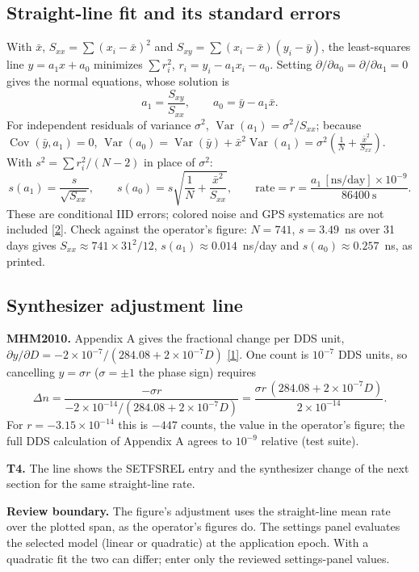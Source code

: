 \documentclass[11pt,a4paper]{article}
\newcommand{\manual}{\href{https://www.gb.nrao.edu/~fghigo/timer/MSMmaser/Maser_UG_75666-201_Rev_J.PDF}{[1]}}
\newcommand{\nist}{\href{https://tf.nist.gov/general/pdf/2220.pdf}{[2]}}
\newcommand{\warning}[1]{\par\noindent\colorbox{light}{\parbox{\dimexpr\linewidth-2\fboxsep}{\textbf{Review boundary.} #1}}\par}
\begin{document}
\subsection{Straight-line fit and its standard errors}
With $\bar x$, $S_{xx}=\sum(x_i-\bar x)^2$ and $S_{xy}=\sum(x_i-\bar x)(y_i-\bar y)$, the
least-squares line $y=a_1x+a_0$ minimizes $\sum r_i^2$, $r_i=y_i-a_1x_i-a_0$. Setting
$\partial/\partial a_0=\partial/\partial a_1=0$ gives the normal equations, whose solution is
\[
a_1=\frac{S_{xy}}{S_{xx}},\qquad a_0=\bar y-a_1\bar x .
\]
For independent residuals of variance $\sigma^2$, $\operatorname{Var}(a_1)=\sigma^2/S_{xx}$;
because $\operatorname{Cov}(\bar y,a_1)=0$,
$\operatorname{Var}(a_0)=\operatorname{Var}(\bar y)+\bar x^2\operatorname{Var}(a_1)
=\sigma^2\left(\frac1N+\frac{\bar x^2}{S_{xx}}\right)$. With
$s^2=\sum r_i^2/(N-2)$ in place of $\sigma^2$:
\[
s(a_1)=\frac{s}{\sqrt{S_{xx}}},\qquad s(a_0)=s\sqrt{\frac1N+\frac{\bar x^2}{S_{xx}}},\qquad
\text{rate}=r=\frac{a_1\,[\mathrm{ns/day}]\times10^{-9}}{86400\ \mathrm{s}} .
\]
These are conditional IID errors; colored noise and GPS systematics are not included \nist.
Check against the operator's figure: $N=741$, $s=3.49$~ns over 31 days gives
$S_{xx}\approx741\times31^2/12$, $s(a_1)\approx0.014$~ns/day and $s(a_0)\approx0.257$~ns, as printed.

\subsection{Synthesizer adjustment line}
\textbf{MHM2010.} Appendix A gives the fractional change per DDS unit,
$\partial y/\partial D=-2\times10^{-7}/(284.08+2\times10^{-7}D)$ \manual. One count is
$10^{-7}$ DDS units, so cancelling $y=\sigma r$ ($\sigma=\pm1$ the phase sign) requires
\[
\Delta n=\frac{-\sigma r}{-2\times10^{-14}/(284.08+2\times10^{-7}D)}
=\frac{\sigma r\,(284.08+2\times10^{-7}D)}{2\times10^{-14}} .
\]
For $r=-3.15\times10^{-14}$ this is $-447$ counts, the value in the operator's figure; the
full DDS calculation of Appendix A agrees to $10^{-9}$ relative (test suite).

\textbf{T4.} The line shows the SETFSREL entry and the synthesizer change of the next
section for the same straight-line rate.

\warning{The figure's adjustment uses the straight-line mean rate over the plotted span, as
the operator's figures do. The settings panel evaluates the selected model (linear or
quadratic) at the application epoch. With a quadratic fit the two can differ; enter only
the reviewed settings-panel values.}
\end{document}
